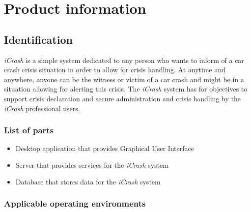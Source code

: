 \chapter{Product information}
\vspace{-6em}


\section{Identification}
\emph{iCrash} is a simple system dedicated to any person who wants to inform of
a car crash crisis situation in order to allow for crisis handling. At anytime
and anywhere, anyone can be the witness or victim of a car crash and might be in
a situation allowing for alerting this crisis. The \emph{iCrash} system has for
objectives to support crisis declaration and secure administration and crisis
handling by the \emph{iCrash} professional users.

\subsection{List of parts}
\begin{itemize}
  \item Desktop application that provides Graphical User Interface
  \item Server that provides services for the \emph{iCrash} system
  \item Database that stores data for the \emph{iCrash} system
\end{itemize}

\subsection{Applicable operating environments}

